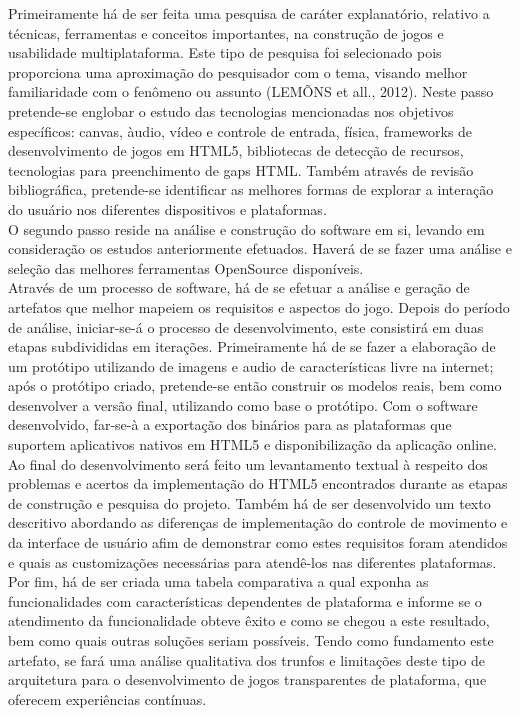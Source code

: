 \documentclass{article}
\begin{document}
Primeiramente há de ser feita uma pesquisa de caráter explanatório, relativo a técnicas, ferramentas e conceitos importantes, na construção de jogos e usabilidade multiplataforma. Este tipo de pesquisa foi selecionado pois proporciona uma aproximação do pesquisador com o tema, visando melhor familiaridade com o fenômeno ou assunto (LEMÕNS et all., 2012). Neste passo pretende-se englobar o estudo das tecnologias mencionadas nos objetivos específicos: canvas, àudio, vídeo e controle de entrada, física, frameworks de desenvolvimento de jogos em HTML5, bibliotecas de detecção de recursos, tecnologias para preenchimento de gaps HTML. Também através de revisão bibliográfica, pretende-se identificar as melhores formas de explorar a interação do usuário nos diferentes dispositivos e plataformas.
\\
	O segundo passo reside na análise e construção do software em si, levando em consideração os estudos anteriormente efetuados. Haverá de se fazer uma análise e seleção das melhores ferramentas OpenSource disponíveis.
\\
	Através de um processo de software, há de se efetuar a análise e geração de artefatos que melhor mapeiem os requisitos e aspectos do jogo. Depois do período de análise, iniciar-se-á o processo de desenvolvimento, este consistirá em duas etapas subdivididas em iterações. Primeiramente há de se fazer a elaboração de um protótipo utilizando de imagens e audio de características livre na internet; após o protótipo criado, pretende-se então construir os modelos reais, bem como desenvolver a versão final, utilizando como base o protótipo. Com o software desenvolvido, far-se-à a exportação dos binários para as plataformas que suportem aplicativos nativos em HTML5 e disponibilização da aplicação online.
\\
	Ao final do desenvolvimento será feito um levantamento textual à respeito dos problemas e acertos da implementação do HTML5 encontrados durante as etapas de construção e pesquisa do projeto. Também há de ser desenvolvido um texto descritivo abordando as diferenças de implementação do controle de movimento e da interface de usuário afim de demonstrar como estes requisitos foram atendidos e quais as customizações necessárias para atendê-los nas diferentes plataformas.
\\
	Por fim, há de ser criada  uma tabela comparativa a qual exponha as funcionalidades com características dependentes de plataforma e informe se o atendimento da funcionalidade obteve êxito e como se chegou a este resultado, bem como quais outras soluções seriam possíveis. Tendo como fundamento este artefato, se fará uma análise qualitativa dos trunfos e limitações deste tipo de arquitetura para o desenvolvimento de jogos transparentes de plataforma, que oferecem experiências contínuas.
\end{document}
